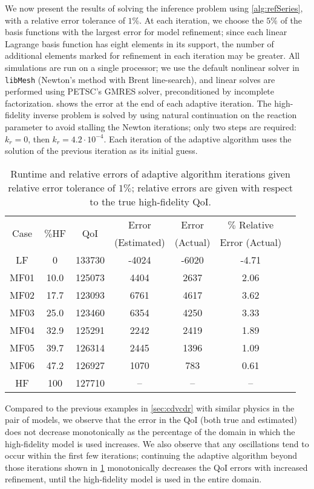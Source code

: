 We now present the results of solving the inference problem using \cref{alg:refSeries}, with a relative error tolerance of $1\%$. At each iteration, we choose the $5\%$ of the basis functions with the largest error for model refinement; since each linear Lagrange basis function has eight elements in its support, the number of additional elements marked for refinement in each iteration may be greater. All simulations are run on a single processor; we use the default nonlinear solver in \texttt{libMesh} (Newton's method with Brent line-search), and linear solves are performed using PETSC's GMRES solver, preconditioned by incomplete factorization.  shows the error at the end of each adaptive iteration. The high-fidelity inverse problem is solved by using natural continuation on the reaction parameter to avoid stalling the Newton iterations; only two steps are required: $k_r=0$, then $k_r=4.2\cdot10^{-4}$. Each iteration of the adaptive algorithm uses the solution of the previous iteration as its initial guess. 
%
\begin{table}[htbp]
\caption{Runtime and relative errors of adaptive algorithm iterations given relative error tolerance of $1\%$; relative errors are given with respect to the true high-fidelity QoI.}
\label{tab:ref3D}
\centering
\begin{tabular}{|c|c|c|c|c|c|c|}
\hline
\multirow{2}{*}{Case} & \multirow{2}{*}{$\%$HF} & \multirow{2}{*}{QoI} & Error & Error & $\%$ Relative \\ 
& & & (Estimated) & (Actual) & Error (Actual) \\ \hline
LF   & 0    & 133730 & -4024 & -6020 & -4.71  \\
MF01 & 10.0 & 125073 & 4404  & 2637  & 2.06   \\
MF02 & 17.7 & 123093 & 6761  & 4617  & 3.62   \\
MF03 & 25.0 & 123460 & 6354  & 4250  & 3.33   \\
MF04 & 32.9 & 125291 & 2242  & 2419  & 1.89   \\
MF05 & 39.7 & 126314 & 2445  & 1396  & 1.09   \\
MF06 & 47.2 & 126927 & 1070  & 783   & 0.61   \\
HF   & 100  & 127710 & --    & --     & --    \\ \hline
\end{tabular}
\end{table}
%

Compared to the previous examples in \cref{sec:cdvcdr} with similar physics in the pair of models, we observe that the error in the QoI (both true and estimated) does not decrease monotonically as the percentage of the domain in which the high-fidelity model is used increases. We also observe that any oscillations tend to occur within the first few iterations; continuing the adaptive algorithm beyond those iterations shown in \cref{tab:ref3D} monotonically decreases the QoI errors with increased refinement, until the high-fidelity model is used in the entire domain.

